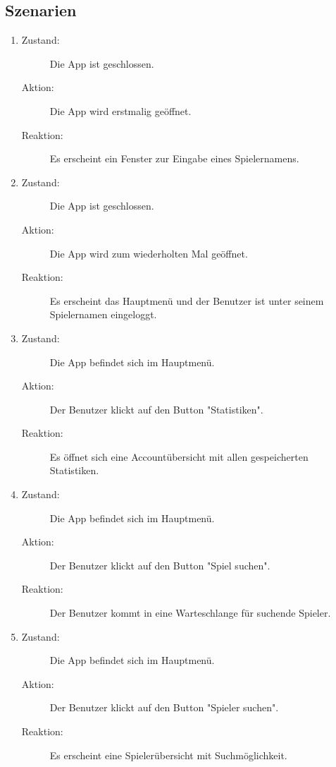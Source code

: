 \documentclass[parskip=full]{scrartcl}
\begin{document}
\subsection{Szenarien}
\begin{enumerate}
 
    \item
	\begin{description}
	\item[Zustand:] Die App ist geschlossen.
	\item[Aktion:] Die App wird erstmalig geöffnet.
	\item[Reaktion:] Es erscheint ein Fenster zur Eingabe eines Spielernamens.  \\	
	\end{description}
	
	\item
	\begin{description}
	\item[Zustand:] Die App ist geschlossen.
	\item[Aktion:] Die App wird zum wiederholten Mal geöffnet.
	\item[Reaktion:] Es erscheint das Hauptmenü und der Benutzer ist unter seinem Spielernamen eingeloggt. \\
	\end{description}
	
	\item
	\begin{description}
	\item[Zustand:] Die App befindet sich im Hauptmenü.
	\item[Aktion:] Der Benutzer klickt auf den Button "Statistiken".
	\item[Reaktion:] Es öffnet sich eine Accountübersicht mit allen gespeicherten Statistiken.  \\
	\end{description}
	
	\item
	\begin{description}
	\item[Zustand:] Die App befindet sich im Hauptmenü.
	\item[Aktion:] Der Benutzer klickt auf den Button "Spiel suchen".
	\item[Reaktion:] Der Benutzer kommt in eine Warteschlange für suchende Spieler.  \\
	\end{description}
	
	\item
	\begin{description}
	\item[Zustand:] Die App befindet sich im Hauptmenü.
	\item[Aktion:] Der Benutzer klickt auf den Button "Spieler suchen".
	\item[Reaktion:] Es erscheint eine Spielerübersicht mit Suchmöglichkeit.  \\
	\end{description}
	

\end{enumerate}
\end{document}
